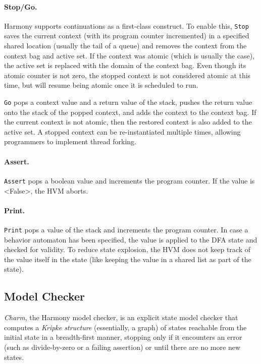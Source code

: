\documentclass[twocolumn]{article}
\begin{document}
\paragraph{Stop/Go.}  Harmony supports continuations as a first-class
construct.  To enable this, \texttt{Stop} saves the current context (with
its program counter incremented) in a specified shared location (usually the
tail of a queue) and removes the context from the context bag and active set.
If the context was atomic (which is usually the case), the active set is
replaced with the domain of the context bag.  Even though its atomic counter
is not zero, the stopped context is not considered atomic at this time, but
will resume being atomic once it is scheduled to run.

\texttt{Go} pops a context value and a return value of the stack,
pushes the return value onto the stack of the popped context, and adds
the context to the context bag.  If the current context is not atomic,
then the restored context is also added to the active set.
A stopped context can be re-instantiated multiple times, allowing
programmers to implement thread forking.

\paragraph{Assert.}  \texttt{Assert} pops a boolean value and increments
the program counter.  If the value is <{False}>, the HVM aborts.

\paragraph{Print.}  \texttt{Print} pops a value of the stack and increments
the program counter.  In case a behavior automaton has been specified, the
value is applied to the DFA state and checked for validity.
To reduce state explosion, the HVM does not keep track of the value itself
in the state (like keeping the value in a shared list as part of the state).

\subsection{Model Checker}

\emph{Charm}, the Harmony model checker, is an explicit state model
checker that computes a \emph{Kripke structure} (essentially, a graph)
of states reachable
from the initial state in a breadth-first manner, stopping only if
it encounters an error (such as divide-by-zero or a failing assertion)
or until there are no more new states.
\end{document}
